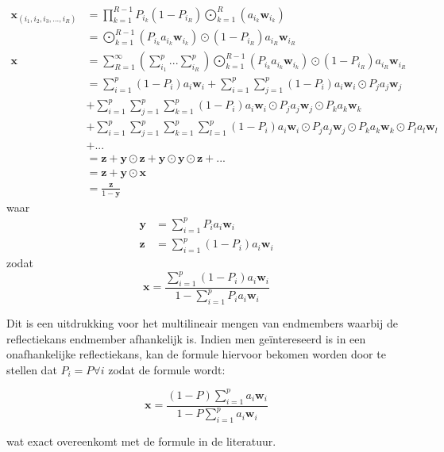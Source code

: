 \documentclass[12pt]{report}
\DeclareMathOperator*{\Odot}{\bigodot}
\begin{document}
\begin{align}
\bm{x}_{(i_1,i_2,i_3,...,i_R)} &= \prod_{k=1}^{R-1}P_{i_k} (1-P_{i_R}) \Odot_{k=1}^R \left(a_{i_k} \bm{w}_{i_k}\right) \\
&= \Odot_{k=1}^{R-1} \left(P_{i_k}a_{i_k} \bm{w}_{i_k}\right) \odot (1-P_{i_R}) a_{i_R} \bm{w}_{i_R} \\
\bm{x} &= \sum_{R=1}^{\infty} \left(\sum_{i_1}^{p} ... \sum_{i_R}^{p}\right) \Odot_{k=1}^{R-1} \left(P_{i_k}a_{i_k} \bm{w}_{i_k}\right) \odot (1-P_{i_R}) a_{i_R} \bm{w}_{i_R} \\
&= \sum_{i=1}^p (1-P_i) a_{i} \bm{w}_{i} + \sum_{i=1}^p \sum_{j=1}^p (1-P_i) a_{i} \bm{w}_{i} \odot P_j a_{j} \bm{w}_{j} \nonumber\\&+ \sum_{i=1}^p \sum_{j=1}^p \sum_{k=1}^p (1-P_i) a_{i} \bm{w}_{i} \odot P_j a_{j} \bm{w}_{j} \odot P_k a_{k} \bm{w}_{k} \nonumber\\&+ \sum_{i=1}^p \sum_{j=1}^p \sum_{k=1}^p  \sum_{l=1}^p (1-P_i) a_{i} \bm{w}_{i} \odot P_j a_{j} \bm{w}_{j} \odot P_k a_{k} \bm{w}_{k} \odot P_l a_{l} \bm{w}_{l} \nonumber \\& + ... \\
&= \bm{z} + \bm{y}\odot\bm{z} + \bm{y}\odot\bm{y}\odot\bm{z} + ... \\
&= \bm{z} + \bm{y}\odot\bm{x} \\
 &= \frac{\bm{z}}{1-\bm{y}}
\end{align}
waar
\begin{align}
\bm{y} &= \sum_{i=1}^p P_i a_{i} \bm{w}_{i} \\
\bm{z} &= \sum_{i=1}^p (1-P_i) a_{i} \bm{w}_{i} 
\end{align}
zodat
\begin{equation}
\bm{x} = \frac{\sum_{i=1}^p (1-P_i) a_{i} \bm{w}_{i}}{1-\sum_{i=1}^p P_i a_{i} \bm{w}_{i}} \label{eq:Pi}
\end{equation}

Dit is een uitdrukking voor het multilineair mengen van endmembers waarbij de reflectiekans endmember afhankelijk is. Indien men ge\"intereseerd is in een onafhankelijke reflectiekans, kan de formule hiervoor bekomen worden door te stellen dat $P_i = P \forall i$ zodat de formule wordt:

\begin{equation}
\bm{x} = \frac{(1-P) \sum_{i=1}^p a_{i} \bm{w}_{i}}{1-P\sum_{i=1}^p  a_{i} \bm{w}_{i}} \label{eq:P}
\end{equation}

wat exact overeenkomt met de formule in de literatuur\cite{mlinmix}.
\end{document}
